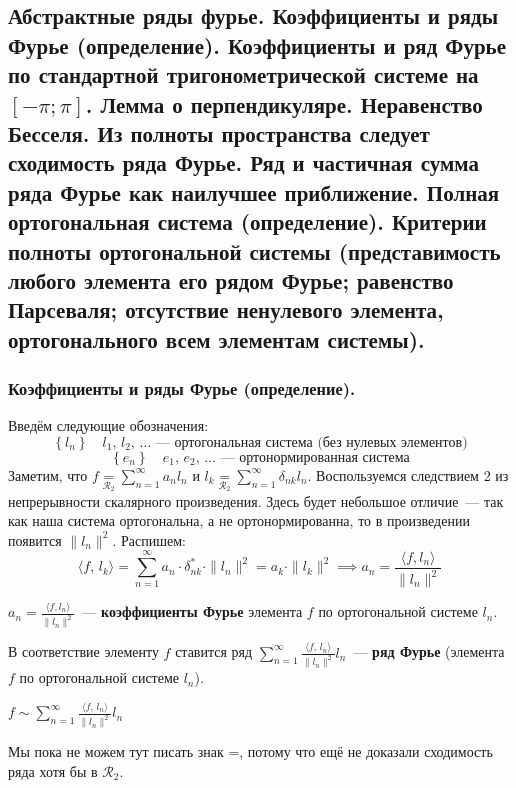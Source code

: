 \subsection{Абстрактные ряды фурье. Коэффициенты и ряды Фурье (определение). Коэффициенты и ряд Фурье по стандартной тригонометрической системе на $[-\pi; \pi]$. Лемма о перпендикуляре. Неравенство Бесселя. Из полноты пространства следует сходимость ряда Фурье. Ряд и частичная сумма ряда Фурье как наилучшее приближение. Полная ортогональная система (определение). Критерии полноты ортогональной системы (представимость любого элемента его рядом Фурье; равенство Парсеваля; отсутствие ненулевого элемента, ортогонального всем элементам системы).}

\subsubsection{Коэффициенты и ряды Фурье (определение). \label{subsubsec:label1}}
Введём следующие обозначения:
\[\left\{ l_n \right\} \quad l_1,\, l_2,\, \ldots\text{~--- ортогональная система (без нулевых элементов)}\]
\[\left\{ e_n \right\} \quad e_1,\, e_2,\, \ldots\text{~--- ортонормированная система}\]
Заметим, что $f \underset{\mathcal{R}_2}{=} \sum_{n=1}^\infty a_n l_n$ и $l_k \underset{\mathcal{R}_2}{=} \sum_{n=1}^\infty \delta_{nk} l_n$. Воспользуемся следствием 2 из непрерывности скалярного произведения. Здесь будет небольшое отличие~--- так как наша система ортогональна, а не ортонормированна, то в произведении появится $\| l_n \|^2$.
Распишем: \[\langle f,\, l_k \rangle = \sum_{n=1}^\infty a_n \cdot \delta_{nk}^*  \cdot \| l_n \|^2 = a_k \cdot \| l_k \|^2 \implies a_n = \frac{\langle f, l_n \rangle}{\| l_n \|^2}\]
\begin{definition*}
    $a_n = \frac{\langle f, l_n \rangle}{\| l_n \|^2}$~--- \textbf{коэффициенты Фурье} элемента $f$ по ортогональной системе $l_n$. 
\end{definition*}

\begin{definition*}
    В соответствие элементу $f$ ставится ряд $\sum_{n=1}^\infty \frac{\langle f,\, l_n \rangle}{\| l_n \|^2} l_n$~--- \textbf{ряд Фурье} (элемента $f$ по ортогональной системе $l_n$).
\end{definition*}
\begin{designation*}
    $f \sim \sum_{n=1}^\infty \frac{\langle f,\, l_n \rangle}{\| l_n \|^2} l_n$
\end{designation*}
Мы пока не можем тут писать знак =, потому что ещё не доказали сходимость ряда хотя бы в $\mathcal{R}_2$.

